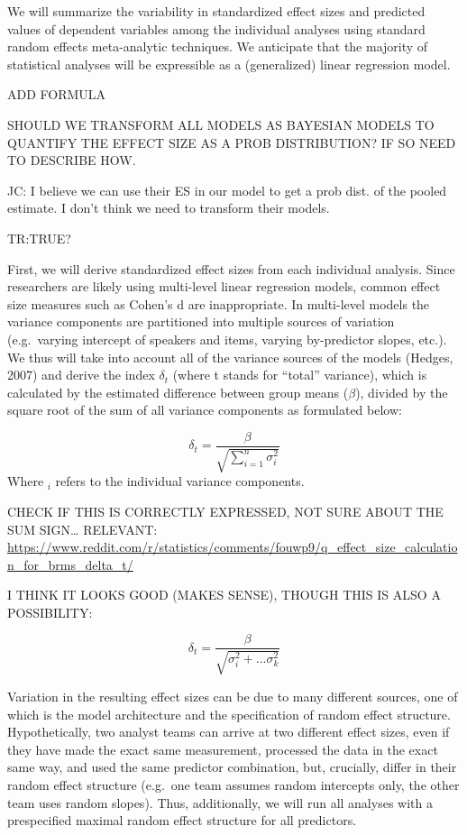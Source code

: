 \documentclass[
  english,
  man]{apa6}
\begin{document}
We will summarize the variability in standardized effect sizes and predicted values of dependent variables among the individual analyses using standard random effects meta-analytic techniques.
We anticipate that the majority of statistical analyses will be expressible as a (generalized) linear regression model.

ADD FORMULA

SHOULD WE TRANSFORM ALL MODELS AS BAYESIAN MODELS TO QUANTIFY THE EFFECT SIZE AS A PROB DISTRIBUTION? IF SO NEED TO DESCRIBE HOW.

JC: I believe we can use their ES in our model to get a prob dist. of the pooled estimate. I don't think we need to transform their models.

TR:TRUE?

First, we will derive standardized effect sizes from each individual analysis.
Since researchers are likely using multi-level linear regression models, common effect size measures such as Cohen's d are inappropriate.
In multi-level models the variance components are partitioned into multiple sources of variation (e.g.~varying intercept of speakers and items, varying by-predictor slopes, etc.).
We thus will take into account all of the variance sources of the models (Hedges, 2007) and derive the index \(\delta_t\) (where t stands for \enquote{total} variance), which is calculated by the estimated difference between group means (\(\beta\)), divided by the square root of the sum of all variance components as formulated below:

\[\delta_t = \frac{\beta}{\sqrt{\sum_{i=1}^{n} \sigma^2_{i}}}\]
Where \(_i\) refers to the individual variance components.

CHECK IF THIS IS CORRECTLY EXPRESSED, NOT SURE ABOUT THE SUM SIGN\ldots{}
RELEVANT: \url{https://www.reddit.com/r/statistics/comments/fouwp9/q_effect_size_calculation_for_brms_delta_t/}

I THINK IT LOOKS GOOD (MAKES SENSE), THOUGH THIS IS ALSO A POSSIBILITY:

\[\delta_t = \frac{\beta}{\sqrt{\sigma^2_{i} + ... \sigma^2_{k}}}\]

Variation in the resulting effect sizes can be due to many different sources, one of which is the model architecture and the specification of random effect structure.
Hypothetically, two analyst teams can arrive at two different effect sizes, even if they have made the exact same measurement, processed the data in the exact same way, and used the same predictor combination, but, crucially, differ in their random effect structure (e.g.~one team assumes random intercepts only, the other team uses random slopes).
Thus, additionally, we will run all analyses with a prespecified maximal random effect structure for all predictors.
\end{document}
